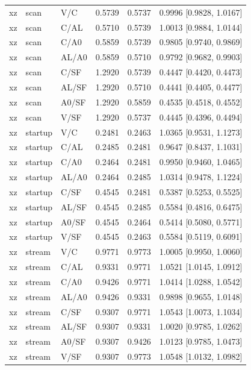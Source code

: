\begin{longtable}{lllrrl}
xz & scan & V/C & 0.5739 & 0.5737 & 0.9996 [0.9828, 1.0167] \\
xz & scan & C/AL & 0.5710 & 0.5739 & 1.0013 [0.9884, 1.0144] \\
xz & scan & C/A0 & 0.5859 & 0.5739 & 0.9805 [0.9740, 0.9869] \\
xz & scan & AL/A0 & 0.5859 & 0.5710 & 0.9792 [0.9682, 0.9903] \\
xz & scan & C/SF & 1.2920 & 0.5739 & 0.4447 [0.4420, 0.4473] \\
xz & scan & AL/SF & 1.2920 & 0.5710 & 0.4441 [0.4405, 0.4477] \\
xz & scan & A0/SF & 1.2920 & 0.5859 & 0.4535 [0.4518, 0.4552] \\
xz & scan & V/SF & 1.2920 & 0.5737 & 0.4445 [0.4396, 0.4494] \\
xz & startup & V/C & 0.2481 & 0.2463 & 1.0365 [0.9531, 1.1273] \\
xz & startup & C/AL & 0.2485 & 0.2481 & 0.9647 [0.8437, 1.1031] \\
xz & startup & C/A0 & 0.2464 & 0.2481 & 0.9950 [0.9460, 1.0465] \\
xz & startup & AL/A0 & 0.2464 & 0.2485 & 1.0314 [0.9478, 1.1224] \\
xz & startup & C/SF & 0.4545 & 0.2481 & 0.5387 [0.5253, 0.5525] \\
xz & startup & AL/SF & 0.4545 & 0.2485 & 0.5584 [0.4816, 0.6475] \\
xz & startup & A0/SF & 0.4545 & 0.2464 & 0.5414 [0.5080, 0.5771] \\
xz & startup & V/SF & 0.4545 & 0.2463 & 0.5584 [0.5119, 0.6091] \\
xz & stream & V/C & 0.9771 & 0.9773 & 1.0005 [0.9950, 1.0060] \\
xz & stream & C/AL & 0.9331 & 0.9771 & 1.0521 [1.0145, 1.0912] \\
xz & stream & C/A0 & 0.9426 & 0.9771 & 1.0414 [1.0288, 1.0542] \\
xz & stream & AL/A0 & 0.9426 & 0.9331 & 0.9898 [0.9655, 1.0148] \\
xz & stream & C/SF & 0.9307 & 0.9771 & 1.0543 [1.0073, 1.1034] \\
xz & stream & AL/SF & 0.9307 & 0.9331 & 1.0020 [0.9785, 1.0262] \\
xz & stream & A0/SF & 0.9307 & 0.9426 & 1.0123 [0.9785, 1.0473] \\
xz & stream & V/SF & 0.9307 & 0.9773 & 1.0548 [1.0132, 1.0982] \\
\bottomrule\end{longtable}
